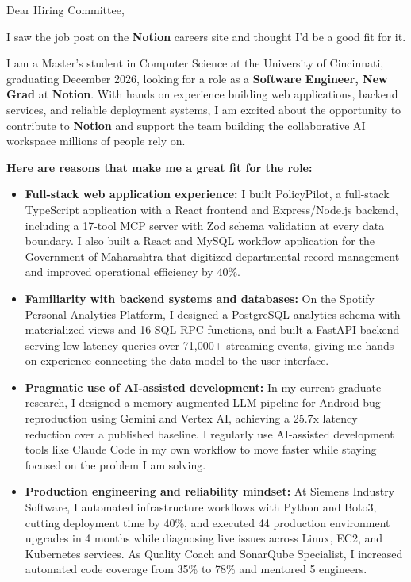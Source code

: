 \documentclass[11pt]{letter}
\date{}
\begin{document}
\begin{letter}{}

\opening{Dear Hiring Committee,}

I saw the job post on the \textbf{Notion} careers site and thought I'd be a good fit for it.

I am a Master's student in Computer Science at the University of Cincinnati, graduating December 2026, looking for a role as a \textbf{Software Engineer, New Grad} at \textbf{Notion}. With hands on experience building web applications, backend services, and reliable deployment systems, I am excited about the opportunity to contribute to \textbf{Notion} and support the team building the collaborative AI workspace millions of people rely on.

\textbf{Here are reasons that make me a great fit for the role:}

\begin{itemize}[leftmargin=*, itemsep=0.45em]
    \item \textbf{Full-stack web application experience:} I built PolicyPilot, a full-stack TypeScript application with a React frontend and Express/Node.js backend, including a 17-tool MCP server with Zod schema validation at every data boundary. I also built a React and MySQL workflow application for the Government of Maharashtra that digitized departmental record management and improved operational efficiency by 40\%.

    \item \textbf{Familiarity with backend systems and databases:} On the Spotify Personal Analytics Platform, I designed a PostgreSQL analytics schema with materialized views and 16 SQL RPC functions, and built a FastAPI backend serving low-latency queries over 71,000+ streaming events, giving me hands on experience connecting the data model to the user interface.

    \item \textbf{Pragmatic use of AI-assisted development:} In my current graduate research, I designed a memory-augmented LLM pipeline for Android bug reproduction using Gemini and Vertex AI, achieving a 25.7x latency reduction over a published baseline. I regularly use AI-assisted development tools like Claude Code in my own workflow to move faster while staying focused on the problem I am solving.

    \item \textbf{Production engineering and reliability mindset:} At Siemens Industry Software, I automated infrastructure workflows with Python and Boto3, cutting deployment time by 40\%, and executed 44 production environment upgrades in 4 months while diagnosing live issues across Linux, EC2, and Kubernetes services. As Quality Coach and SonarQube Specialist, I increased automated code coverage from 35\% to 78\% and mentored 5 engineers.
\end{itemize}


\end{letter}
\end{document}
